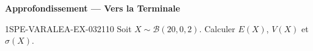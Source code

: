 \begin{center}\textbf{Approfondissement — Vers la Terminale}\end{center}
\begin{exercice}{1SPE-VARALEA-EX-032}{1}{10}
Soit $X \sim \mathcal{B}(20, 0{,}2)$. Calculer $E(X)$, $V(X)$ et $\sigma(X)$.
\end{exercice}
